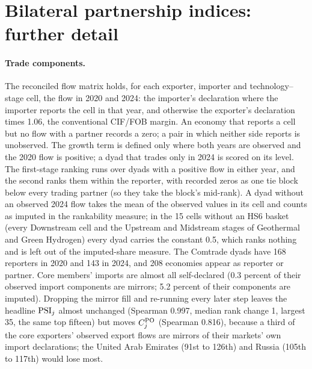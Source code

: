 \section{Bilateral partnership indices: further detail}\label{oa:bilateral}

\paragraph{Trade components.} The reconciled flow matrix holds, for each exporter, importer and
technology--stage cell, the flow in 2020 and 2024: the importer's declaration where the importer
reports the cell in that year, and otherwise the exporter's declaration times 1.06, the conventional
CIF/FOB margin. An economy that reports a cell but no flow with a partner records a zero; a pair in
which neither side reports is unobserved. The growth term is defined only where both years are
observed and the 2020 flow is positive; a dyad that trades only in 2024 is scored on its level. The
first-stage ranking runs over dyads with a positive flow in either year, and the second ranks them
within the reporter, with recorded zeros as one tie block below every trading partner (so they take
the block's mid-rank). A dyad without an observed 2024 flow takes the mean of the observed values in
its cell and counts as imputed in the rankability measure; in the 15 cells without an HS6 basket
(every Downstream cell and the Upstream and Midstream stages of Geothermal and Green Hydrogen) every
dyad carries the constant 0.5, which ranks nothing and is left out of the imputed-share measure. The
Comtrade dyads have 168 reporters in 2020 and 143 in 2024, and 208 economies appear as reporter or
partner. Core members' imports are almost all self-declared (0.3 percent of their observed import
components are mirrors; 5.2 percent of their components are imputed). Dropping the mirror fill and
re-running every later step leaves the headline $\mathrm{PSI}_j$ almost unchanged (Spearman 0.997, median
rank change 1, largest 35, the same top fifteen) but moves $C^{\mathrm{PO}}_j$ (Spearman 0.816), because a
third of the core exporters' observed export flows are mirrors of their markets' own import
declarations; the United Arab Emirates (91st to 126th) and Russia (105th to 117th) would lose most.

